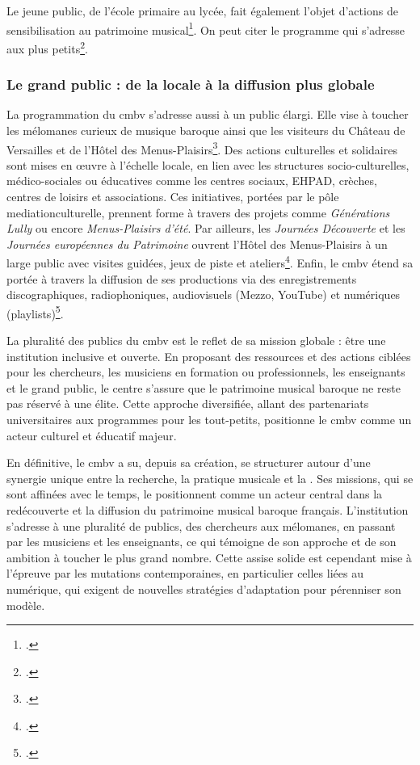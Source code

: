 Le jeune public, de l’école primaire au lycée, fait également l’objet d’actions de sensibilisation au patrimoine musical\footcite{centredemusiquebaroquedeversaillesProjetEtablissement2022}. On peut citer le programme  qui s'adresse aux plus petits\footcite{centredemusiquebaroquedeversaillesRapportActivite2023}.

\subsubsection{Le grand public : de la  locale à la diffusion plus globale}

La programmation du \gls{cmbv} s’adresse aussi à un public élargi. Elle vise à toucher les mélomanes curieux de musique baroque ainsi que les visiteurs du Château de Versailles et de l’Hôtel des Menus-Plaisirs\footcite{centredemusiquebaroquedeversaillesProjetEtablissement2022}. Des actions culturelles et solidaires sont mises en œuvre à l’échelle locale, en lien avec les structures socio-culturelles, médico-sociales ou éducatives comme les centres sociaux, EHPAD, crèches, centres de loisirs et associations. Ces initiatives, portées par le pôle \gls{mediationculturelle}, prennent forme à travers des projets comme \textit{Générations Lully} ou encore \textit{Menus-Plaisirs d’été}. Par ailleurs, les \textit{Journées Découverte} et les \textit{Journées européennes du Patrimoine} ouvrent l'Hôtel des Menus-Plaisirs à un large public avec visites guidées, jeux de piste et ateliers\footcite{centredemusiquebaroquedeversaillesProjetEtablissement2022}. Enfin, le \gls{cmbv} étend sa portée à travers la diffusion de ses productions via des enregistrements discographiques, radiophoniques, audiovisuels (Mezzo, YouTube) et numériques (playlists)\footcite{centredemusiquebaroquedeversaillesRapportActivite2023}.

La pluralité des publics du \gls{cmbv} est le reflet de sa mission globale : être une institution inclusive et ouverte. En proposant des ressources et des actions ciblées pour les chercheurs, les musiciens en formation ou professionnels, les enseignants et le grand public, le centre s'assure que le patrimoine musical baroque ne reste pas réservé à une élite. Cette approche diversifiée, allant des partenariats universitaires aux programmes pour les tout-petits, positionne le \gls{cmbv} comme un acteur culturel et éducatif majeur.

En définitive, le \gls{cmbv} a su, depuis sa création, se structurer autour d'une synergie unique entre la recherche, la pratique musicale et la . Ses missions, qui se sont affinées avec le temps, le positionnent comme un acteur central dans la redécouverte et la diffusion du patrimoine musical baroque français. L'institution s'adresse à une pluralité de publics, des chercheurs aux mélomanes, en passant par les musiciens et les enseignants, ce qui témoigne de son approche et de son ambition à toucher le plus grand nombre. Cette assise solide est cependant mise à l'épreuve par les mutations contemporaines, en particulier celles liées au numérique, qui exigent de nouvelles stratégies d'adaptation pour pérenniser son modèle.

